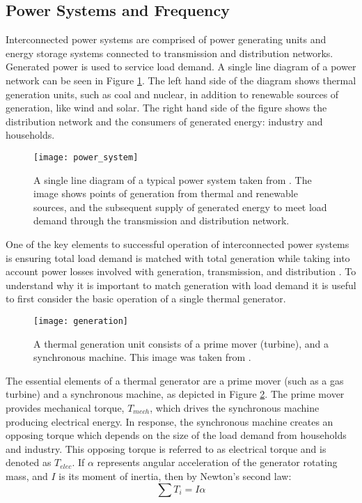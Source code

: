 \subsection{Power Systems and Frequency}
Interconnected power systems are comprised of power generating units and energy storage systems connected to transmission and distribution networks. Generated power is used to service load demand. A single line diagram of a power network can be seen in Figure \ref{fig:generation}. The left hand side of the diagram shows thermal generation units, such as coal and nuclear, in addition to renewable sources of generation, like wind and solar. The right hand side of the figure shows the distribution network and the consumers of generated energy: industry and households.
\begin{figure}[ht]
	\centering
	\texttt{[image: power\_system]}
	\caption{A single line diagram of a typical power system taken from \cite{Glavic2019}. The image shows points of generation from thermal and renewable sources, and the subsequent supply of generated energy to meet load demand through the transmission and distribution network.}
	\label{fig:generation}
\end{figure}

One of the key elements to successful operation of interconnected power systems is ensuring total load demand is matched with total generation while taking into account power losses involved with generation, transmission, and distribution \cite{Wood2013}. To understand why it is important to match generation with load demand it is useful to first consider the basic operation of a single thermal generator. 
\begin{figure}[h]
\centering
\texttt{[image: generation]}
\caption{A thermal generation unit consists of a prime mover (turbine), and a synchronous machine. This image was taken from \cite{Wood2013}.}
\label{fig:turbine}
\end{figure}

The essential elements of a thermal generator are a prime mover (such as a gas turbine) and a synchronous machine, as depicted in Figure \ref{fig:turbine}. The prime mover provides mechanical torque, $T_{mech}$, which drives the synchronous machine producing electrical energy. In response, the synchronous machine creates an opposing torque which depends on the size of the load demand from households and industry. This opposing torque is referred to as electrical torque and is denoted as $T_{elec}$. If $\alpha$ represents angular acceleration of the generator rotating mass, and $I$ is its moment of inertia, then by Newton's second law:
\begin{equation}
\sum T_i = I \alpha \label{eq:1}
\end{equation}

